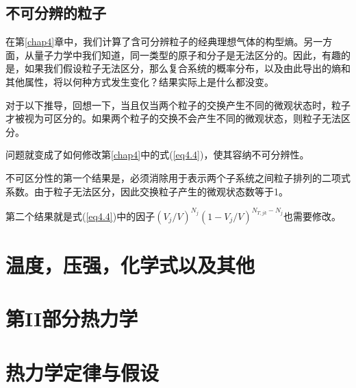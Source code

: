 \documentclass[UTF8]{ctexart}
\numberwithin{equation}{section}%
\numberwithin{figure}{section}%
\begin{document}
    \subsection{不可分辨的粒子}
    在第\ref{chap4}章中，我们计算了含可分辨粒子的经典理想气体的构型熵。另一方面，从量子力学中我们知道，同一类型的原子和分子是无法区分的。因此，有趣的是，如果我们假设粒子无法区分，那么复合系统的概率分布，以及由此导出的熵和其他属性，将以何种方式发生变化？结果实际上是什么都没变。

    对于以下推导，回想一下，当且仅当两个粒子的交换产生不同的微观状态时，粒子才被视为可区分的。如果两个粒子的交换不会产生不同的微观状态，则粒子无法区分。

    问题就变成了如何修改第\ref{chap4}中的式(\ref{eq4.4})，使其容纳不可分辨性。

    不可区分性的第一个结果是，必须消除用于表示两个子系统之间粒子排列的二项式系数。由于粒子无法区分，因此交换粒子产生的微观状态数等于1。

    第二个结果就是式(\ref{eq4.4})中的因子$\left(V_{j} / V\right)^{N_{j}}\left(1-V_{j} / V\right)^{N_{T, j k}-N_{j}}$也需要修改。



    \clearpage
    \section{温度，压强，化学式以及其他}\label{chap8}

    \clearpage
    \section*{第II部分\quad 热力学}
    \label{part2}
    \section{热力学定律与假设}\label{chap9}


    
\end{document}
